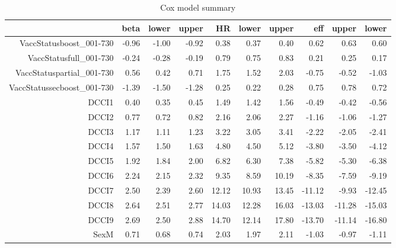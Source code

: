 \begin{table}[ht]
\centering
\begin{tabular}{rrrrrrrrrr}
  \hline
 & beta & lower & upper & HR & lower & upper & eff & upper & lower \\ 
  \hline
VaccStatusboost\_001-730 & -0.96 & -1.00 & -0.92 & 0.38 & 0.37 & 0.40 & 0.62 & 0.63 & 0.60 \\ 
  VaccStatusfull\_001-730 & -0.24 & -0.28 & -0.19 & 0.79 & 0.75 & 0.83 & 0.21 & 0.25 & 0.17 \\ 
  VaccStatuspartial\_001-730 & 0.56 & 0.42 & 0.71 & 1.75 & 1.52 & 2.03 & -0.75 & -0.52 & -1.03 \\ 
  VaccStatussecboost\_001-730 & -1.39 & -1.50 & -1.28 & 0.25 & 0.22 & 0.28 & 0.75 & 0.78 & 0.72 \\ 
  DCCI1 & 0.40 & 0.35 & 0.45 & 1.49 & 1.42 & 1.56 & -0.49 & -0.42 & -0.56 \\ 
  DCCI2 & 0.77 & 0.72 & 0.82 & 2.16 & 2.06 & 2.27 & -1.16 & -1.06 & -1.27 \\ 
  DCCI3 & 1.17 & 1.11 & 1.23 & 3.22 & 3.05 & 3.41 & -2.22 & -2.05 & -2.41 \\ 
  DCCI4 & 1.57 & 1.50 & 1.63 & 4.80 & 4.50 & 5.12 & -3.80 & -3.50 & -4.12 \\ 
  DCCI5 & 1.92 & 1.84 & 2.00 & 6.82 & 6.30 & 7.38 & -5.82 & -5.30 & -6.38 \\ 
  DCCI6 & 2.24 & 2.15 & 2.32 & 9.35 & 8.59 & 10.19 & -8.35 & -7.59 & -9.19 \\ 
  DCCI7 & 2.50 & 2.39 & 2.60 & 12.12 & 10.93 & 13.45 & -11.12 & -9.93 & -12.45 \\ 
  DCCI8 & 2.64 & 2.51 & 2.77 & 14.03 & 12.28 & 16.03 & -13.03 & -11.28 & -15.03 \\ 
  DCCI9 & 2.69 & 2.50 & 2.88 & 14.70 & 12.14 & 17.80 & -13.70 & -11.14 & -16.80 \\ 
  SexM & 0.71 & 0.68 & 0.74 & 2.03 & 1.97 & 2.11 & -1.03 & -0.97 & -1.11 \\ 
   \hline
\end{tabular}
\caption{Cox model summary} 
\end{table}

